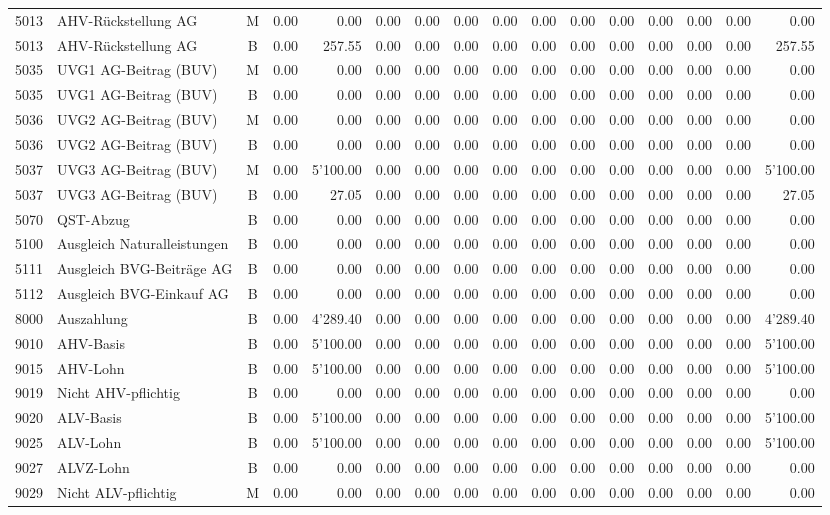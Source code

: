 \documentclass[8pt,a4paper]{extarticle}
\begin{document}
\begin{longtable}{@{\extracolsep{\fill}} l l c r r r r r r r r r r r r r}
5013&AHV-Rückstellung AG&M&0.00&0.00&0.00&0.00&0.00&0.00&0.00&0.00&0.00&0.00&0.00&0.00&0.00\\
5013&AHV-Rückstellung AG&B&0.00&257.55&0.00&0.00&0.00&0.00&0.00&0.00&0.00&0.00&0.00&0.00&257.55\\
5035&UVG1 AG-Beitrag (BUV)&M&0.00&0.00&0.00&0.00&0.00&0.00&0.00&0.00&0.00&0.00&0.00&0.00&0.00\\
5035&UVG1 AG-Beitrag (BUV)&B&0.00&0.00&0.00&0.00&0.00&0.00&0.00&0.00&0.00&0.00&0.00&0.00&0.00\\
5036&UVG2 AG-Beitrag (BUV)&M&0.00&0.00&0.00&0.00&0.00&0.00&0.00&0.00&0.00&0.00&0.00&0.00&0.00\\
5036&UVG2 AG-Beitrag (BUV)&B&0.00&0.00&0.00&0.00&0.00&0.00&0.00&0.00&0.00&0.00&0.00&0.00&0.00\\
5037&UVG3 AG-Beitrag (BUV)&M&0.00&5'100.00&0.00&0.00&0.00&0.00&0.00&0.00&0.00&0.00&0.00&0.00&5'100.00\\
5037&UVG3 AG-Beitrag (BUV)&B&0.00&27.05&0.00&0.00&0.00&0.00&0.00&0.00&0.00&0.00&0.00&0.00&27.05\\
5070&QST-Abzug&B&0.00&0.00&0.00&0.00&0.00&0.00&0.00&0.00&0.00&0.00&0.00&0.00&0.00\\
5100&Ausgleich Naturalleistungen&B&0.00&0.00&0.00&0.00&0.00&0.00&0.00&0.00&0.00&0.00&0.00&0.00&0.00\\
5111&Ausgleich BVG-Beiträge AG&B&0.00&0.00&0.00&0.00&0.00&0.00&0.00&0.00&0.00&0.00&0.00&0.00&0.00\\
5112&Ausgleich BVG-Einkauf AG&B&0.00&0.00&0.00&0.00&0.00&0.00&0.00&0.00&0.00&0.00&0.00&0.00&0.00\\
8000&Auszahlung&B&0.00&4'289.40&0.00&0.00&0.00&0.00&0.00&0.00&0.00&0.00&0.00&0.00&4'289.40\\
9010&AHV-Basis&B&0.00&5'100.00&0.00&0.00&0.00&0.00&0.00&0.00&0.00&0.00&0.00&0.00&5'100.00\\
9015&AHV-Lohn&B&0.00&5'100.00&0.00&0.00&0.00&0.00&0.00&0.00&0.00&0.00&0.00&0.00&5'100.00\\
9019&Nicht AHV-pflichtig&B&0.00&0.00&0.00&0.00&0.00&0.00&0.00&0.00&0.00&0.00&0.00&0.00&0.00\\
9020&ALV-Basis&B&0.00&5'100.00&0.00&0.00&0.00&0.00&0.00&0.00&0.00&0.00&0.00&0.00&5'100.00\\
9025&ALV-Lohn&B&0.00&5'100.00&0.00&0.00&0.00&0.00&0.00&0.00&0.00&0.00&0.00&0.00&5'100.00\\
9027&ALVZ-Lohn&B&0.00&0.00&0.00&0.00&0.00&0.00&0.00&0.00&0.00&0.00&0.00&0.00&0.00\\
9029&Nicht ALV-pflichtig&M&0.00&0.00&0.00&0.00&0.00&0.00&0.00&0.00&0.00&0.00&0.00&0.00&0.00\\

\end{longtable}
\end{document}

